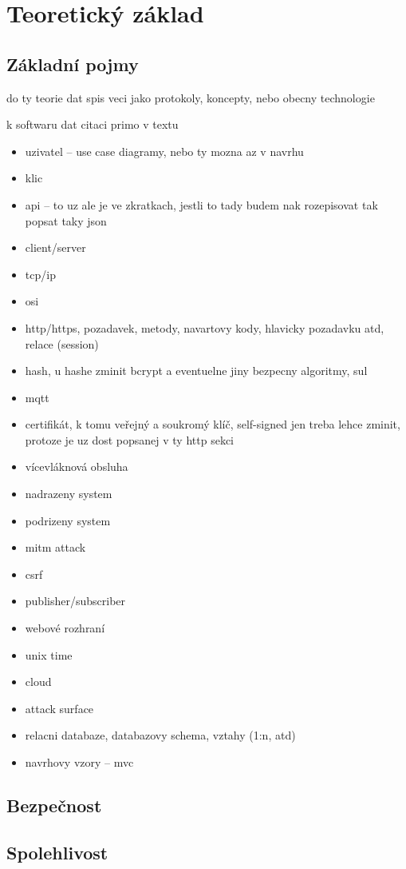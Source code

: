 \chapter{Teoretický základ}
\label{sec:te}

\section{Základní pojmy}

do ty teorie dat spis veci jako protokoly, koncepty, nebo obecny technologie

k softwaru dat citaci primo v textu

\begin{itemize}
    \item uzivatel -- use case diagramy, nebo ty mozna az v navrhu
    \item klic
    \item api -- to uz ale je ve zkratkach, jestli to tady budem nak rozepisovat tak popsat taky json
    \item client/server
    \item tcp/ip
    \item osi
    \item http/https, pozadavek, metody, navartovy kody, hlavicky pozadavku atd, relace (session)
    \item hash, u hashe zminit bcrypt a eventuelne jiny bezpecny algoritmy, sul
    \item mqtt
    \item certifikát, k tomu veřejný a soukromý klíč, self-signed jen treba lehce zminit, protoze je uz dost popsanej v ty http sekci
    \item vícevláknová obsluha
    \item nadrazeny system
    \item podrizeny system
    \item mitm attack
    \item csrf
    \item publisher/subscriber
    \item webové rozhraní
    \item unix time
    \item cloud
    \item attack surface
    \item relacni databaze, databazovy schema, vztahy (1:n, atd)
    \item navrhovy vzory -- mvc
\end{itemize}

\section{Bezpečnost}

\section{Spolehlivost}